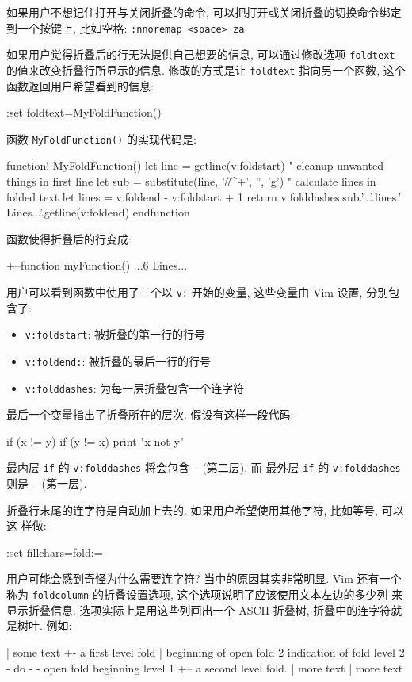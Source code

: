 \begin{warning}
    如果用户不想记住打开与关闭折叠的命令, 可以把打开或关闭折叠的切换命令绑定
    到一个按键上, 比如空格: \texttt{:nnoremap <space> za}
\end{warning}

如果用户觉得折叠后的行无法提供自己想要的信息, 可以通过修改选项
\texttt{foldtext} 的值来改变折叠行所显示的信息. 修改的方式是让
\texttt{foldtext} 指向另一个函数, 这个函数返回用户希望看到的信息:
\begin{vimcode}
:set foldtext=MyFoldFunction()
\end{vimcode}
函数 \texttt{MyFoldFunction()} 的实现代码是:
\begin{vimcode}
function! MyFoldFunction()
	let line = getline(v:foldstart)
	" cleanup unwanted things in first line
	let sub = substitute(line, '/\*\|\*/\|^\s+', '', 'g')
	" calculate lines in folded text
	let lines = v:foldend - v:foldstart + 1
	return  v:folddashes.sub.'...'.lines.' Lines...'.getline(v:foldend)
endfunction
\end{vimcode}
函数使得折叠后的行变成:
\begin{vimcode}
+--function myFunction() {...6 Lines...}
\end{vimcode}

用户可以看到函数中使用了三个以 \texttt{v:} 开始的变量, 这些变量由 Vim 设置,
分别包含了:
\begin{itemize}
    \item \texttt{v:foldstart}: 被折叠的第一行的行号
    \item \texttt{v:foldend:}: 被折叠的最后一行的行号
    \item \texttt{v:folddashes}: 为每一层折叠包含一个连字符
\end{itemize}

最后一个变量指出了折叠所在的层次. 假设有这样一段代码:
\begin{vimcode}
if (x != y) {
    if (y != x) {
        print "x not y"
    }
}
\end{vimcode}
最内层 \texttt{if} 的 \texttt{v:folddashes} 将会包含 \texttt{--} (第二层), 而
最外层 \texttt{if} 的 \texttt{v:folddashes} 则是 \texttt{-} (第一层).

折叠行末尾的连字符是自动加上去的. 如果用户希望使用其他字符, 比如等号, 可以这
样做:
\begin{vimcode}
:set fillchars=fold:=
\end{vimcode}

用户可能会感到奇怪为什么需要连字符? 当中的原因其实非常明显. Vim 还有一个称为
\texttt{foldcolumn} 的折叠设置选项, 这个选项说明了应该使用文本左边的多少列
来显示折叠信息. 选项实际上是用这些列画出一个 ASCII 折叠树, 折叠中的连字符就
是树叶. 例如:
\begin{vimcode}
| some text
+- a first level fold
|
    beginning of open fold
2   indication of fold level
2     - do -
- open fold beginning level 1
+-- a second level fold.
| more text
| more text
\end{vimcode}

